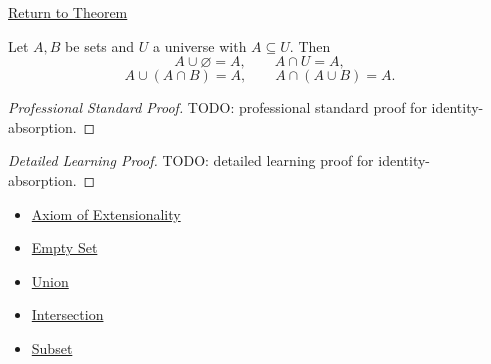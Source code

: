\newpage
{}
\label{prf:identity-absorption}

\begin{remark*}[Return]
\hyperref[thm:identity-absorption]{Return to Theorem}
\end{remark*}

\begin{theorem*}
Let $A,B$ be sets and $U$ a universe with $A \subseteq U$. Then
\[
A \cup \varnothing = A,
\qquad
A \cap U = A,
\]
\[
A \cup (A \cap B) = A,
\qquad
A \cap (A \cup B) = A.
\]
\end{theorem*}

\begin{proof}[Professional Standard Proof]
\LRAProofBodyStart
TODO: professional standard proof for identity-absorption.
\end{proof}

\begin{proof}[Detailed Learning Proof]
\LRAProofBodyStart
TODO: detailed learning proof for identity-absorption.
\end{proof}

\begin{remark*}
\end{remark*}

\begin{dependencies}
\begin{itemize}
  \item \hyperref[ax:extensionality]{Axiom of Extensionality}
  \item \hyperref[def:empty-set]{Empty Set}
  \item \hyperref[def:union]{Union}
  \item \hyperref[def:intersection]{Intersection}
  \item \hyperref[def:subset]{Subset}
\end{itemize}
\end{dependencies}

\clearpage
